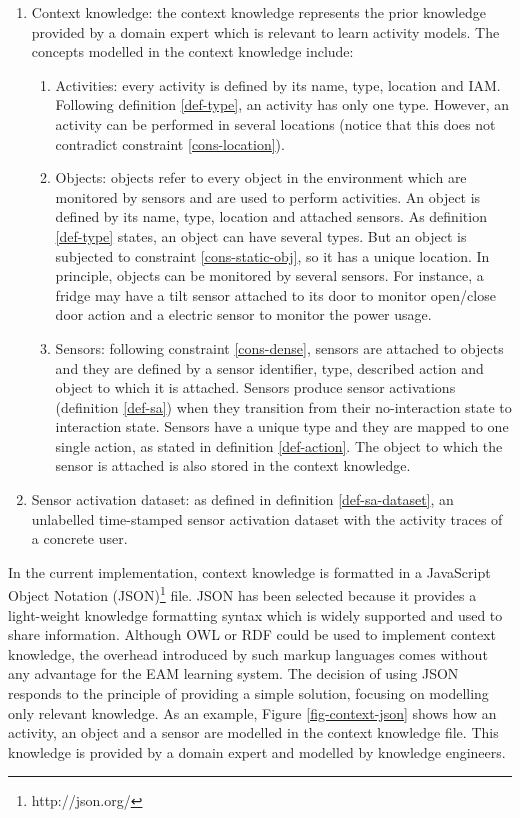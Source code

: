 \begin{enumerate}
 \item Context knowledge: the context knowledge represents the prior knowledge provided by a domain expert which is relevant to learn activity models. The concepts modelled in the context knowledge include: 
 \begin{enumerate}
  \item Activities: every activity is defined by its name, type, location and IAM. Following definition \ref{def-type}, an activity has only one type. However, an activity can be performed in several locations (notice that this does not contradict constraint \ref{cons-location}). 
  \item Objects: objects refer to every object in the environment which are monitored by sensors and are used to perform activities. An object is defined by its name, type, location and attached sensors. As definition \ref{def-type} states, an object can have several types. But an object is subjected to constraint \ref{cons-static-obj}, so it has a unique location. In principle, objects can be monitored by several sensors. For instance, a fridge may have a tilt sensor attached to its door to monitor open/close door action and a electric sensor to monitor the power usage.
  \item Sensors: following constraint \ref{cons-dense}, sensors are attached to objects and they are defined by a sensor identifier, type, described action and object to which it is attached. Sensors produce sensor activations (definition \ref{def-sa}) when they transition from their no-interaction state to interaction state. Sensors have a unique type and they are mapped to one single action, as stated in definition \ref{def-action}. The object to which the sensor is attached is also stored in the context knowledge.
 \end{enumerate}
 
 \item Sensor activation dataset: as defined in definition \ref{def-sa-dataset}, an unlabelled time-stamped sensor activation dataset with the activity traces of a concrete user.
\end{enumerate}

In the current implementation, context knowledge is formatted in a JavaScript Object Notation (JSON)\footnote{http://json.org/} file. JSON has been selected because it provides a light-weight knowledge formatting syntax which is widely supported and used to share information. Although OWL or RDF could be used to implement context knowledge, the overhead introduced by such markup languages comes without any advantage for the EAM learning system. The decision of using JSON responds to the principle of providing a simple solution, focusing on modelling only relevant knowledge. As an example, Figure \ref{fig-context-json} shows how an activity, an object and a sensor are modelled in the context knowledge file. This knowledge is provided by a domain expert and modelled by knowledge engineers. 

